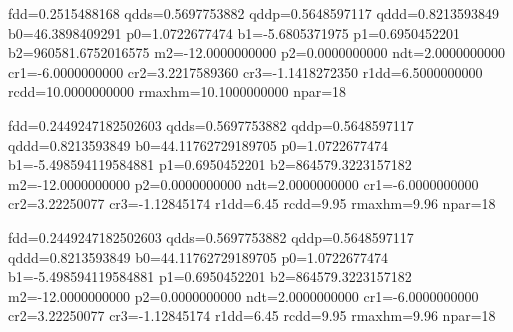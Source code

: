 \documentclass[11pt]{article}
\begin{document}
fdd=0.2515488168
qdds=0.5697753882
qddp=0.5648597117
qddd=0.8213593849
b0=46.3898409291
p0=1.0722677474
b1=-5.6805371975
p1=0.6950452201
b2=960581.6752016575
m2=-12.0000000000
p2=0.0000000000
ndt=2.0000000000
cr1=-6.0000000000
cr2=3.2217589360
cr3=-1.1418272350
r1dd=6.5000000000
rcdd=10.0000000000
rmaxhm=10.1000000000 npar=18 

fdd=0.2449247182502603
qdds=0.5697753882
qddp=0.5648597117
qddd=0.8213593849
b0=44.11762729189705
p0=1.0722677474
b1=-5.498594119584881
p1=0.6950452201
b2=864579.3223157182
m2=-12.0000000000
p2=0.0000000000
ndt=2.0000000000
cr1=-6.0000000000
cr2=3.22250077
cr3=-1.12845174
r1dd=6.45
rcdd=9.95
rmaxhm=9.96
npar=18 


fdd=0.2449247182502603 qdds=0.5697753882 qddp=0.5648597117 qddd=0.8213593849 b0=44.11762729189705 p0=1.0722677474 b1=-5.498594119584881 p1=0.6950452201 b2=864579.3223157182 m2=-12.0000000000 p2=0.0000000000 ndt=2.0000000000 cr1=-6.0000000000 cr2=3.22250077 cr3=-1.12845174 r1dd=6.45 rcdd=9.95 rmaxhm=9.96 npar=18 
\end{document}
